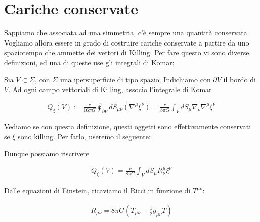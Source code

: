 \documentclass{report}
\begin{document}
\section{Cariche conservate}

Sappiamo che associata ad una simmetria, c'è sempre una quantità conservata. Vogliamo allora essere in grado di costruire cariche conservate a partire da uno spaziotempo che ammette dei vettori di Killing. Per fare questo vi sono diverse definizioni, ed una di queste use gli integrali di Komar: 

Sia \(V \subset \Sigma\), con \(\Sigma\) una ipersuperficie di tipo spazio. Indichiamo con \(\partial V\) il bordo di \(V\). Ad ogni campo vettoriali di Killing, associo l'integrale di Komar 

\begin{align}
    Q_\xi(V) := \frac{c}{16\pi G}\oint_{\partial V} dS_{\mu\nu} (\nabla^\mu \xi^\nu) = \frac{c}{8\pi G}\int_V dS_\mu \nabla_\nu \nabla^\mu \xi^\nu
\end{align}

Vediamo se con questa definizione, questi oggetti sono effettivamente conservati se \(\xi\) sono killing. Per farlo, useremo il seguente: 




Dunque possiamo riscrivere 

\begin{align}
    Q_\xi(V) = \frac{c}{8\pi G}\int_V dS_\mu R^\mu_\nu \xi^\nu
\end{align}

Dalle equazioni di Einstein, ricaviamo il Ricci in funzione di \(T^{\mu\nu}\): 

\begin{align}
    R_{\mu\nu} = 8\pi G (T_{\mu\nu} - \frac{1}{2}g_{\mu\nu}T)
\end{align}
\end{document}
